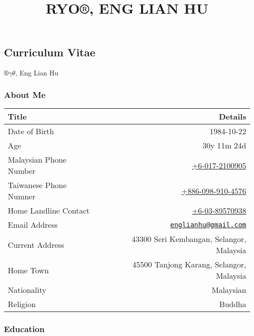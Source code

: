 \documentclass[]{article}
\title{RYO®, ENG LIAN HU}
\author{}
\date{}
\begin{document}
\maketitle

{
\hypersetup{linkcolor=black}
\setcounter{tocdepth}{2}
\tableofcontents
}
\subsection{Curriculum Vitae}\label{curriculum-vitae}

\(®γθ\), Eng Lian Hu

\subsubsection{About Me}\label{about-me}

\begin{longtable}[c]{@{}lr@{}}
\toprule
\textbf{Title} & \textbf{Details}\tabularnewline
\midrule
\endhead
Date of Birth & 1984-10-22\tabularnewline
Age & 30y 11m 24d\tabularnewline
Malaysian Phone Number &
\href{tel:+60172100905}{+6-017-2100905}\tabularnewline
Taiwanese Phone Numner &
\href{tel:+8860989104576}{+886-098-910-4576}\tabularnewline
Home Landline Contact &
\href{tel:+60389570938}{+6-03-89570938}\tabularnewline
Email Address &
\href{mailto:englianhu@gmail.com}{\nolinkurl{englianhu@gmail.com}}\tabularnewline
Current Address & 43300 Seri Kembangan, Selangor,
Malaysia\tabularnewline
Home Town & 45500 Tanjong Karang, Selangor, Malaysia\tabularnewline
Nationality & Malaysian\tabularnewline
Religion & Buddha\tabularnewline
\bottomrule
\end{longtable}

\subsubsection{Education}\label{education}
\end{document}

